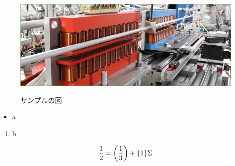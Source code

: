 \documentclass[a4paper,11pt,uplatex]{jsarticle}
\begin{document}
\clearpage

\begin{figure}[tb]
  \centering
  \includegraphics[width=0.8\linewidth]{image/1-1.jpg}\\
  \caption{サンプルの図}
  \label{sample_image}
\end{figure}

\begin{itemize}
  \item a
\end{itemize}
\begin{enumerate}
  \item b
\end{enumerate}

\begin{align}
\frac{1}{2} = \qty(\frac{1}{3}) + \qty{1}\Sigma
\end{align}
\end{document}
